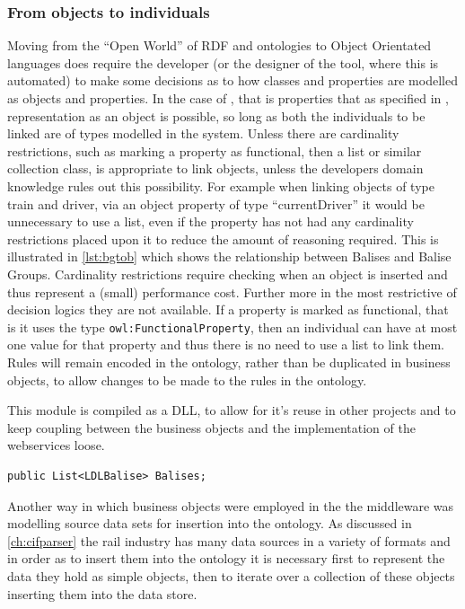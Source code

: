 \subsubsection{From objects to individuals}
 Moving from the ``Open World'' of RDF and ontologies to Object Orientated languages does require the developer (or the designer of the tool, where this is automated) to make some decisions as to how classes and properties are modelled as objects and properties. In the case of , that is properties that  as specified in \citet{McGuinness04}, representation as an object is possible, so long as both the individuals to be linked are of types modelled in the system. Unless there are cardinality restrictions, such as marking a property as functional, then a list or similar collection class, is appropriate to link objects, unless the developers domain knowledge rules out this possibility. For example when linking objects of type train and driver, via an object property of type ``currentDriver'' it would be unnecessary to use a list, even if the property has not had any cardinality restrictions placed upon it to reduce the amount of reasoning required. This is illustrated in \autoref{lst:bgtob} which shows the relationship between Balises and Balise Groups. Cardinality restrictions require checking when an object is inserted and thus represent a (small) performance cost. Further more in the most restrictive of decision logics they are not available. If a property is marked as functional, that is it uses the type \texttt{owl:FunctionalProperty}, then an individual can have at most one value for that property and thus there is no need to use a list to link them. Rules will remain encoded in the ontology, rather than be duplicated in business objects, to allow changes to be made to the rules in the ontology.


This module is compiled as a DLL, to allow for it's reuse in other projects and to keep coupling between the business objects and the implementation of the webservices loose.
\begin{lstlisting}[language={[Sharp]C},frame=tb,caption={Linking of Balises to BaliseGroups},label=lst:bgtob]
   public List<LDLBalise> Balises;
\end{lstlisting}

 Another way in which business objects were employed in the the middleware was modelling source data sets for insertion into the ontology. As discussed in \autoref{ch:cifparser} the rail industry has many data sources in a variety of formats and in order as to insert them into the ontology it is necessary first to represent the data they hold as simple objects, then to iterate over a collection of these objects inserting them into the data store.

